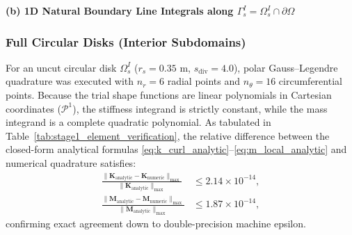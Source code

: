\documentclass[preprint,12pt]{elsarticle}
\begin{document}
\begin{table}[!t]
    \vspace{0.8em}
    \textbf{(b) 1D Natural Boundary Line Integrals along $\Gamma_s^I = \Omega_s^I \cap \partial\Omega$}
    \vspace{0.2em}

\end{table}

\subsubsection{Full Circular Disks (Interior Subdomains)}
For an uncut circular disk $\Omega_s^I$ ($r_s = 0.35\text{ m}$, $s_{\mathrm{div}} = 4.0$), polar Gauss--Legendre quadrature was executed with $n_r = 6$ radial points and $n_\theta = 16$ circumferential points. Because the trial shape functions are linear polynomials in Cartesian coordinates ($\mathcal{P}^1$), the stiffness integrand is strictly constant, while the mass integrand is a complete quadratic polynomial. As tabulated in Table~\ref{tab:stage1_element_verification}, the relative difference between the closed-form analytical formulas \eqref{eq:k_curl_analytic}--\eqref{eq:m_local_analytic} and numerical quadrature satisfies:
\begin{align}
    \frac{\|\mathbf{K}_{\mathrm{analytic}} - \mathbf{K}_{\mathrm{numeric}}\|_{\max}}{\|\mathbf{K}_{\mathrm{analytic}}\|_{\max}} & \le 2.14 \times 10^{-14}, \\
    \frac{\|\mathbf{M}_{\mathrm{analytic}} - \mathbf{M}_{\mathrm{numeric}}\|_{\max}}{\|\mathbf{M}_{\mathrm{analytic}}\|_{\max}} & \le 1.87 \times 10^{-14},
\end{align}
confirming exact agreement down to double-precision machine epsilon.
\end{document}

